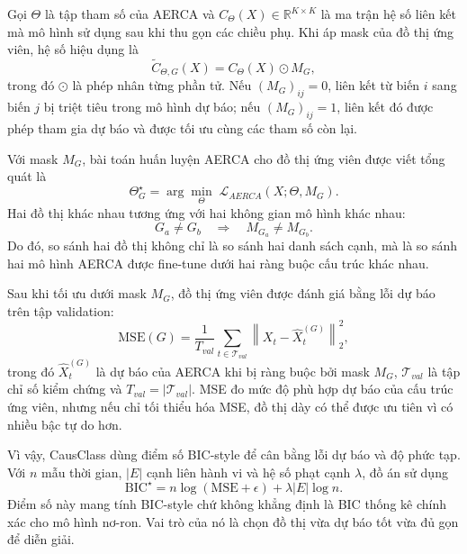 Gọi \(\Theta\) là tập tham số của AERCA và \(C_\Theta(X)\in\mathbb{R}^{K\times K}\) là ma trận hệ số liên kết mà mô hình sử dụng sau khi thu gọn các chiều phụ. Khi áp mask của đồ thị ứng viên, hệ số hiệu dụng là
\begin{equation}
\label{eq:masked-causal-score}
    \widetilde{C}_{\Theta,G}(X)=C_\Theta(X)\odot M_G,
\end{equation}
trong đó \(\odot\) là phép nhân từng phần tử. Nếu \((M_G)_{ij}=0\), liên kết từ biến \(i\) sang biến \(j\) bị triệt tiêu trong mô hình dự báo; nếu \((M_G)_{ij}=1\), liên kết đó được phép tham gia dự báo và được tối ưu cùng các tham số còn lại.

Với mask \(M_G\), bài toán huấn luyện AERCA cho đồ thị ứng viên được viết tổng quát là
\begin{equation}
\label{eq:masked-aerca-objective}
    \Theta_G^{\star}=\arg\min_{\Theta}\;\mathcal{L}_{AERCA}(X;\Theta,M_G).
\end{equation}
Hai đồ thị khác nhau tương ứng với hai không gian mô hình khác nhau:
\begin{equation}
\label{eq:graph-mask-injectivity}
    G_a\neq G_b \quad \Rightarrow \quad M_{G_a}\neq M_{G_b}.
\end{equation}
Do đó, so sánh hai đồ thị không chỉ là so sánh hai danh sách cạnh, mà là so sánh hai mô hình AERCA được fine-tune dưới hai ràng buộc cấu trúc khác nhau.

Sau khi tối ưu dưới mask \(M_G\), đồ thị ứng viên được đánh giá bằng lỗi dự báo trên tập validation:
\begin{equation}
\label{eq:validation-mse}
    \mathrm{MSE}(G)=\frac{1}{T_{val}}\sum_{t\in\mathcal{T}_{val}}\left\|X_t-\hat{X}^{(G)}_t\right\|_2^2,
\end{equation}
trong đó \(\hat{X}^{(G)}_t\) là dự báo của AERCA khi bị ràng buộc bởi mask \(M_G\), \(\mathcal{T}_{val}\) là tập chỉ số kiểm chứng và \(T_{val}=|\mathcal{T}_{val}|\). MSE đo mức độ phù hợp dự báo của cấu trúc ứng viên, nhưng nếu chỉ tối thiểu hóa MSE, đồ thị dày có thể được ưu tiên vì có nhiều bậc tự do hơn.

Vì vậy, CausClass dùng điểm số BIC-style để cân bằng lỗi dự báo và độ phức tạp. Với \(n\) mẫu thời gian, \(|E|\) cạnh liên hành vi và hệ số phạt cạnh \(\lambda\), đồ án sử dụng
\begin{equation}
\label{eq:bic-star}
    \mathrm{BIC}^{\star}=n\log(\mathrm{MSE}+\epsilon)+\lambda |E|\log n.
\end{equation}
Điểm số này mang tính BIC-style chứ không khẳng định là BIC thống kê chính xác cho mô hình nơ-ron. Vai trò của nó là chọn đồ thị vừa dự báo tốt vừa đủ gọn để diễn giải.


